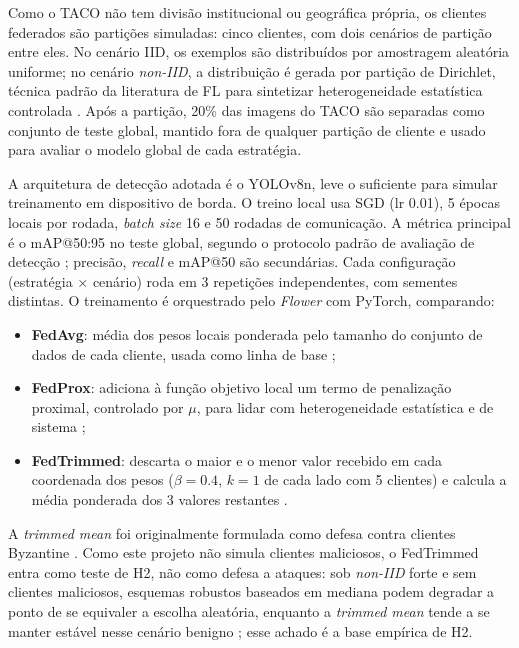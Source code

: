 \documentclass[conference]{IEEEtran}
\begin{document}
Como o TACO não tem divisão institucional ou geográfica própria, os clientes federados são partições simuladas: cinco clientes, com dois cenários de partição entre eles. No cenário IID, os exemplos são distribuídos por amostragem aleatória uniforme; no cenário \textit{non-IID}, a distribuição é gerada por partição de Dirichlet, técnica padrão da literatura de FL para sintetizar heterogeneidade estatística controlada \cite{hsu2019dirichlet}. Após a partição, 20\% das imagens do TACO são separadas como conjunto de teste global, mantido fora de qualquer partição de cliente e usado para avaliar o modelo global de cada estratégia.

A arquitetura de detecção adotada é o YOLOv8n, leve o suficiente para simular treinamento em dispositivo de borda. O treino local usa SGD (lr 0.01), 5 épocas locais por rodada, \textit{batch size} 16 e 50 rodadas de comunicação. A métrica principal é o mAP@50:95 no teste global, segundo o protocolo padrão de avaliação de detecção \cite{lin2014coco}; precisão, \textit{recall} e mAP@50 são secundárias. Cada configuração (estratégia $\times$ cenário) roda em 3 repetições independentes, com sementes distintas. O treinamento é orquestrado pelo \textit{Flower} com PyTorch, comparando:

\begin{itemize}
\item \textbf{FedAvg}: média dos pesos locais ponderada pelo tamanho do conjunto de dados de cada cliente, usada como linha de base \cite{mcmahan2017};
\item \textbf{FedProx}: adiciona à função objetivo local um termo de penalização proximal, controlado por $\mu$, para lidar com heterogeneidade estatística e de sistema \cite{fedprox2020};
\item \textbf{FedTrimmed}: descarta o maior e o menor valor recebido em cada coordenada dos pesos ($\beta = 0.4$, $k=1$ de cada lado com 5 clientes) e calcula a média ponderada dos 3 valores restantes \cite{yin2018}.
\end{itemize}

A \textit{trimmed mean} foi originalmente formulada como defesa contra clientes Byzantine \cite{yin2018}. Como este projeto não simula clientes maliciosos, o FedTrimmed entra como teste de H2, não como defesa a ataques: sob \textit{non-IID} forte e sem clientes maliciosos, esquemas robustos baseados em mediana podem degradar a ponto de se equivaler a escolha aleatória, enquanto a \textit{trimmed mean} tende a se manter estável nesse cenário benigno \cite{li2023byzantine}; esse achado é a base empírica de H2.
\end{document}
